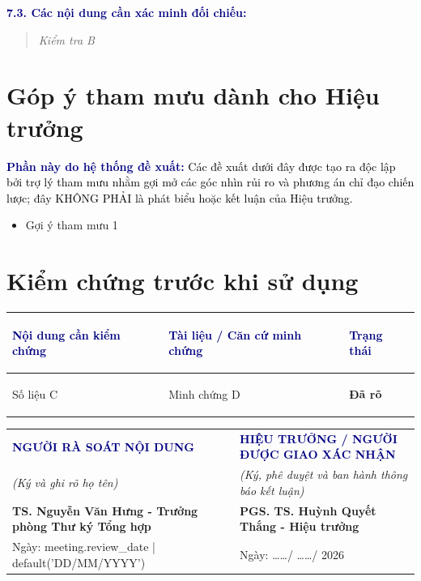 \documentclass[11pt,a4paper]{article}
\newcommand{\notice}[2]{%
  \vspace{4pt}%
  \noindent\colorbox{light}{%
    \parbox{\dimexpr\textwidth-2\fboxsep\relax}{%
      \vspace{2pt}%
      \small\textbf{\textcolor{navy}{#1:}} \textcolor{black}{#2}%
      \vspace{2pt}%
    }%
  }%
  \vspace{4pt}%
}
\begin{document}
\textbf{\textcolor{navy}{7.3. Các nội dung cần xác minh đối chiếu:}}
\begin{quote}
  \textit{ Kiểm tra B }
\end{quote}

\section{Góp ý tham mưu dành cho Hiệu trưởng}

\notice{Phần này do hệ thống đề xuất}{Các đề xuất dưới đây được tạo ra độc lập bởi trợ lý tham mưu nhằm gợi mở các góc nhìn rủi ro và phương án chỉ đạo chiến lược; đây KHÔNG PHẢI là phát biểu hoặc kết luận của Hiệu trưởng.}

\begin{itemize}[leftmargin=1.5em, itemsep=4pt]
  \item Gợi ý tham mưu 1
\end{itemize}

\section{Kiểm chứng trước khi sử dụng}

\begin{tabularx}{\textwidth}{@{}>{\bfseries\raggedright\arraybackslash}p{4cm} >{\raggedright\arraybackslash}X >{\centering\arraybackslash}p{3cm}@{}}
  \toprule
  \rowcolor{light}
  \textcolor{navy}{Nội dung cần kiểm chứng} & \textcolor{navy}{Tài liệu / Căn cứ minh chứng} & \textcolor{navy}{Trạng thái} \\
  \midrule
  Số liệu C & Minh chứng D & \textbf{Đã rõ} \\
  \midrule
  \bottomrule
\end{tabularx}

\vspace{25pt}

\noindent
\begin{tabularx}{\textwidth}{@{}>{\centering\arraybackslash}X >{\centering\arraybackslash}X@{}}
  \textbf{\textcolor{navy}{NGƯỜI RÀ SOÁT NỘI DUNG}} & \textbf{\textcolor{navy}{HIỆU TRƯỞNG / NGƯỜI ĐƯỢC GIAO XÁC NHẬN}} \\
  \textit{(Ký và ghi rõ họ tên)} & \textit{(Ký, phê duyệt và ban hành thông báo kết luận)} \\[50pt]
  \textbf{ TS. Nguyễn Văn Hưng - Trưởng phòng Thư ký Tổng hợp } & \textbf{ PGS. TS. Huỳnh Quyết Thắng - Hiệu trưởng } \\
  Ngày: {{ meeting.review_date | default('DD/MM/YYYY') }} & Ngày: \ldots\ldots / \ldots\ldots / 2026 \\
\end{tabularx}
\end{document}
